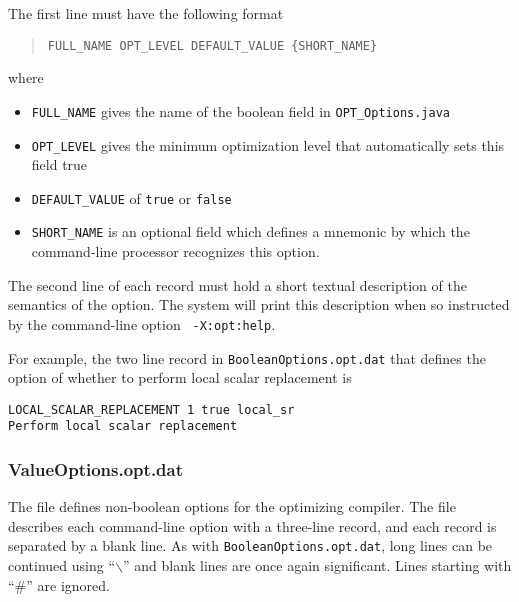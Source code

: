 The first line must have the following format
\begin{quote}
\begin{verbatim}
FULL_NAME OPT_LEVEL DEFAULT_VALUE {SHORT_NAME}
\end{verbatim}
\end{quote}
where
\begin{itemize}
\item {\tt FULL\_NAME} gives the name of the boolean field in {\tt OPT\_Options.java}
\item {\tt OPT\_LEVEL} gives the minimum optimization level that automatically sets this field true
\item {\tt DEFAULT\_VALUE} of {\tt true} or {\tt false}
\item {\tt SHORT\_NAME} is an optional field which defines a mnemonic by which the command-line processor recognizes this option.
\end{itemize}

The second line of each record must hold a short textual description
of the semantics of the option.  The system will print this
description when so instructed by the command-line option {\tt
-X:opt:help}.

For example, the two line record in {\tt BooleanOptions.opt.dat} that
defines the option of whether to perform local scalar replacement is
\begin{verbatim}
LOCAL_SCALAR_REPLACEMENT 1 true local_sr
Perform local scalar replacement
\end{verbatim}

\subsubsection{ValueOptions.opt.dat}

The  file defines non-boolean options for
the optimizing compiler.  The file describes each command-line option 
with a three-line record, and each record is separated
by a blank line.  As with \texttt{BooleanOptions.opt.dat},
long lines can be continued using ``$\backslash$'' and
blank lines are once again significant.
Lines starting with ``\#'' are ignored.

